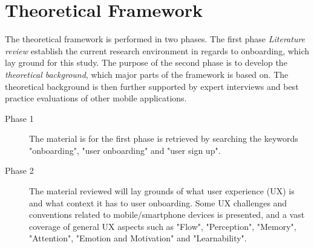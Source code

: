 

\chapter{Theoretical Framework}
\label{chap:theoretical_framework}
The theoretical framework is performed in two phases. The first phase \textit{Literature review} establish the current research environment in regards to onboarding, which lay ground for this study. The purpose of the second phase is to develop the \textit{theoretical background}, which major parts of the framework is based on. The theoretical background is then further supported by expert interviews and best practice evaluations of other mobile applications.

\begin{description}
  \item [Phase 1] The material is for the first phase is retrieved by searching the keywords "onboarding", "user onboarding" and "user sign up".
  \item [Phase 2] The material reviewed will lay grounds of what user experience (UX) is and what context it has to user onboarding. Some UX challenges and conventions related to mobile/smartphone devices is presented, and a vast coverage of general UX aspects such as "Flow", "Perception", "Memory", "Attention", "Emotion and Motivation" and "Learnability".
\end{description}

